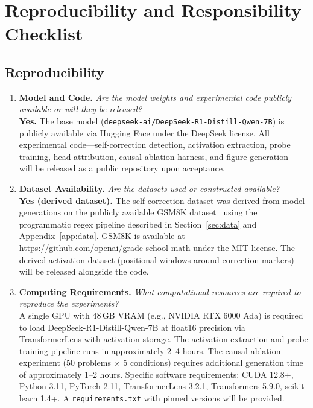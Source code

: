 
\section*{Reproducibility and Responsibility Checklist}

\subsection*{Reproducibility}

\begin{enumerate}

\item \textbf{Model and Code.}
\textit{Are the model weights and experimental code publicly available or will they be released?} \\
\textbf{Yes.} The base model (\texttt{deepseek-ai/DeepSeek-R1-Distill-Qwen-7B}) is publicly available via Hugging Face under the DeepSeek license. All experimental code---self-correction detection, activation extraction, probe training, head attribution, causal ablation harness, and figure generation---will be released as a public repository upon acceptance.

\item \textbf{Dataset Availability.}
\textit{Are the datasets used or constructed available?} \\
\textbf{Yes (derived dataset).} The self-correction dataset was derived from model generations on the publicly available GSM8K dataset~\citep{cobbe2021gsm8k} using the programmatic regex pipeline described in Section~\ref{sec:data} and Appendix~\ref{app:data}. GSM8K is available at \url{https://github.com/openai/grade-school-math} under the MIT license. The derived activation dataset (positional windows around correction markers) will be released alongside the code.

\item \textbf{Computing Requirements.}
\textit{What computational resources are required to reproduce the experiments?} \\
A single GPU with 48\,GB VRAM (e.g., NVIDIA RTX 6000 Ada) is required to load DeepSeek-R1-Distill-Qwen-7B at float16 precision via TransformerLens with activation storage. The activation extraction and probe training pipeline runs in approximately 2--4 hours. The causal ablation experiment (50 problems $\times$ 5 conditions) requires additional generation time of approximately 1--2 hours. Specific software requirements: CUDA 12.8+, Python 3.11, PyTorch 2.11, TransformerLens 3.2.1, Transformers 5.9.0, scikit-learn 1.4+. A \texttt{requirements.txt} with pinned versions will be provided.


\end{enumerate}

